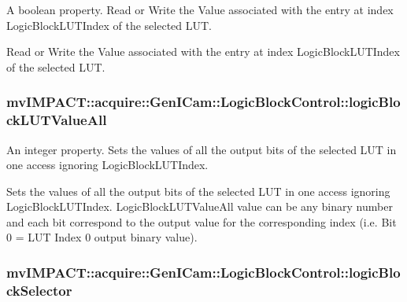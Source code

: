 A boolean property. Read or Write the Value associated with the entry at index Logic\+Block\+L\+U\+T\+Index of the selected L\+U\+T. 

Read or Write the Value associated with the entry at index Logic\+Block\+L\+U\+T\+Index of the selected L\+U\+T. \hypertarget{classmv_i_m_p_a_c_t_1_1acquire_1_1_gen_i_cam_1_1_logic_block_control_a79832d6cadbc750ef8c6a0293e2a30ba}{
\subsubsection[{logic\+Block\+L\+U\+T\+Value\+All}]{ mv\+I\+M\+P\+A\+C\+T\+::acquire\+::\+Gen\+I\+Cam\+::\+Logic\+Block\+Control\+::logic\+Block\+L\+U\+T\+Value\+All}}\label{classmv_i_m_p_a_c_t_1_1acquire_1_1_gen_i_cam_1_1_logic_block_control_a79832d6cadbc750ef8c6a0293e2a30ba}


An integer property. Sets the values of all the output bits of the selected L\+U\+T in one access ignoring Logic\+Block\+L\+U\+T\+Index. 

Sets the values of all the output bits of the selected L\+U\+T in one access ignoring Logic\+Block\+L\+U\+T\+Index. Logic\+Block\+L\+U\+T\+Value\+All value can be any binary number and each bit correspond to the output value for the corresponding index (i.\+e. Bit 0 = L\+U\+T Index 0 output binary value). \hypertarget{classmv_i_m_p_a_c_t_1_1acquire_1_1_gen_i_cam_1_1_logic_block_control_a9868d7f6639f3e51774871a571e0dfe7}{
\subsubsection[{logic\+Block\+Selector}]{ mv\+I\+M\+P\+A\+C\+T\+::acquire\+::\+Gen\+I\+Cam\+::\+Logic\+Block\+Control\+::logic\+Block\+Selector}}\label{classmv_i_m_p_a_c_t_1_1acquire_1_1_gen_i_cam_1_1_logic_block_control_a9868d7f6639f3e51774871a571e0dfe7}


